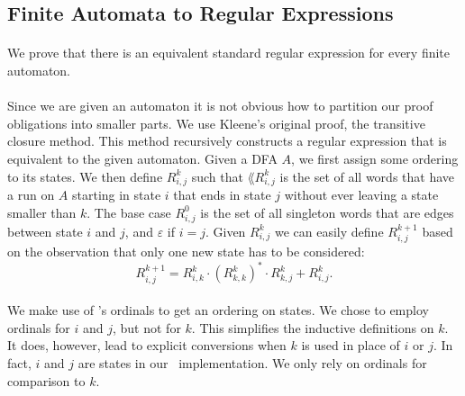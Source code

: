                            \subsection{Finite Automata to Regular Expressions}
                            \paragraph{}
                            We prove that there is an equivalent standard regular expression for every finite automaton.


                            \paragraph{}
                            Since we are given an automaton it is not obvious how to partition our proof obligations into smaller parts.
                            We use Kleene's original proof, the transitive closure method. 
                            This method recursively constructs a regular expression that is equivalent to the given automaton.
                            Given a DFA $A$, we first assign some ordering to its states. We then define $R^k_{i,j}$ such that 
                            $\lang{R^k_{i,j}}$ is the set of all words that have a run on $A$ starting in state $i$ that ends in state $j$ without ever leaving a state smaller than $k$. 
                            The base case $R^{0}_{i,j}$ is the set of all singleton words that are edges between state $i$ and $j$, and $\varepsilon$ if $i=j$. 
                            Given $R^k_{i,j}$ we can easily define $R^{k+1}_{i,j}$ based on the observation that only one new state has to be considered:
                            \begin{equation*}                    R^{k+1}_{i,j} = R^{k}_{i,k} \cdot (R^{k}_{k,k})^* \cdot R^{k}_{k,j} + R^{k}_{i,j}.                    \end{equation*}
                                \paragraph{}
                                We make use of \ssreflect's ordinals to get an ordering on states. 
                                We chose to employ ordinals for $i$ and $j$, but not for $k$. 
                                This simplifies the inductive definitions on $k$. 
                                It does, however, lead to explicit conversions when $k$ is used in place of $i$ or $j$.
                                In fact, $i$ and $j$ are states in our \coq\ implementation. 
                                We only rely on ordinals for comparison to $k$.
